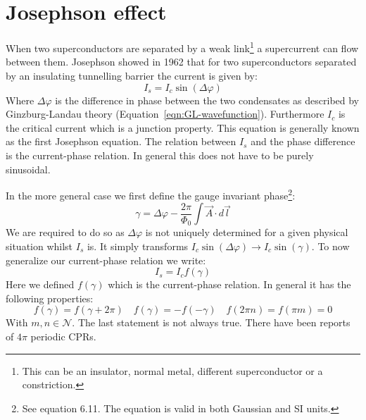 \section{Josephson effect}
\label{sec:josephson-effect}
When two superconductors are separated by a weak link\footnote{This can be an insulator, normal metal, different superconductor or a constriction.} a supercurrent can flow between them. Josephson showed in 1962 that for two superconductors separated by an insulating tunnelling barrier the current is given by\cite{tinkhamIntroductionSuperconductivity}:
\begin{equation}
	I_s = I_c \sin(\Delta \varphi)
	\label{eqn:1st-josephson-relation}
\end{equation}
Where $\Delta \varphi$ is the difference in phase between the two condensates as described by Ginzburg-Landau theory (Equation~\ref{eqn:GL-wavefunction}). Furthermore $I_c$ is the critical current which is a junction property. This equation is generally known as the first Josephson equation. The relation between $I_s$ and the phase difference is the current-phase relation. In general this does not have to be purely sinusoidal.\cite{golubovCurrentphaseRelationJosephson2004a}

In the more general case we first define the gauge invariant phase\footnote{See  equation 6.11. The equation is valid in both Gaussian and SI units.}:
\begin{equation}
	\gamma = \Delta \varphi - \frac{2\pi}{\Phi_0}\int \vec{A} \cdot d\vec{l}
	\label{eqn:gauge-invariant-phase}
\end{equation}
We are required to do so as $\Delta \varphi$ is not uniquely determined for a given physical situation whilst $I_s$ is.\cite{tinkhamIntroductionSuperconductivity} It simply transforms $I_c \sin(\Delta \varphi) \to I_c \sin(\gamma)$. To now generalize our current-phase relation we write:
\begin{equation}
	I_s = I_c f(\gamma)
\end{equation}
Here we defined $f(\gamma)$ which is the current-phase relation. In general it has the following properties\cite{golubovCurrentphaseRelationJosephson2004a}:
\begin{equation}
	f(\gamma) = f(\gamma + 2\pi) \quad f(\gamma) = -f(-\gamma) \quad f(2\pi n) = f(\pi m) = 0
\end{equation}
With $m,n \in \mathcal{N}$. The last statement is not always true. There have been reports of $4\pi$ periodic CPRs.\cite{endresCurrentPhaseRelation2023}


